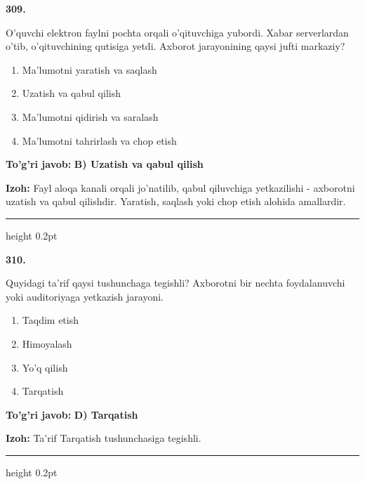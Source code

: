 \documentclass[10pt,a4paper,oneside]{article}
\begin{document}
\noindent\textbf{\color{ink}309.}
\par
O'quvchi elektron faylni pochta orqali o'qituvchiga yubordi. Xabar serverlardan o'tib, o'qituvchining qutisiga yetdi. Axborot jarayonining qaysi jufti markaziy?
\begin{enumerate}[label=\Alph*),leftmargin=9mm]
\item Ma'lumotni yaratish va saqlash
\item Uzatish va qabul qilish
\item Ma'lumotni qidirish va saralash
\item Ma'lumotni tahrirlash va chop etish
\end{enumerate}
\begin{tcolorbox}[enhanced,breakable,colback=teal!4,colframe=teal!50!black,boxrule=0.5pt,arc=1.1mm,left=3mm,right=3mm,top=1.7mm,bottom=1.7mm,before skip=2mm,after skip=2mm]
\textbf{\color{teal}To'g'ri javob:} \textbf{B) Uzatish va qabul qilish}
\par\smallskip
\textbf{Izoh:} Fayl aloqa kanali orqali jo'natilib, qabul qiluvchiga yetkazilishi - axborotni uzatish va qabul qilishdir. Yaratish, saqlash yoki chop etish alohida amallardir.
\end{tcolorbox}
\vspace{2mm}\hrule height 0.2pt \vspace{3mm}

\noindent\textbf{\color{ink}310.}
\par
Quyidagi ta'rif qaysi tushunchaga tegishli? Axborotni bir nechta foydalanuvchi yoki auditoriyaga yetkazish jarayoni.
\begin{enumerate}[label=\Alph*),leftmargin=9mm]
\item Taqdim etish
\item Himoyalash
\item Yo'q qilish
\item Tarqatish
\end{enumerate}
\begin{tcolorbox}[enhanced,breakable,colback=teal!4,colframe=teal!50!black,boxrule=0.5pt,arc=1.1mm,left=3mm,right=3mm,top=1.7mm,bottom=1.7mm,before skip=2mm,after skip=2mm]
\textbf{\color{teal}To'g'ri javob:} \textbf{D) Tarqatish}
\par\smallskip
\textbf{Izoh:} Ta'rif Tarqatish tushunchasiga tegishli.
\end{tcolorbox}
\vspace{2mm}\hrule height 0.2pt \vspace{3mm}
\end{document}
